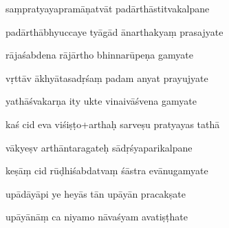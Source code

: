 \documentclass[article,12pt,a4paper]{memoir}%
\newcounter{parCount}
\begin{document}
	  
	  \pstart {} saṃpratyayapramāṇatvāt padārthāstitvakalpane 
	{}
	\pend%
      

	  
	  \pstart \leavevmode%
	padārthābhyuccaye tyāgād ānarthakyaṃ prasajyate 
	{}
	\pend%
      

	  
	  \pstart {} rājaśabdena rājārtho bhinnarūpeṇa gamyate 
	{}
	\pend%
      

	  
	  \pstart \leavevmode%
	vṛttāv ākhyātasadṛśaṃ padam anyat prayujyate 
	{}
	\pend%
      

	  
	  \pstart {} yathāśvakarṇa ity ukte vinaivāśvena gamyate 
	{}
	\pend%
      

	  
	  \pstart \leavevmode%
	kaś cid eva viśiṣṭo+arthaḥ sarveṣu pratyayas tathā 
	{}
	\pend%
      

	  
	  \pstart {} vākyeṣv arthāntaragateḥ sādṛśyaparikalpane 
	{}
	\pend%
      

	  
	  \pstart \leavevmode%
	keṣāṃ cid rūḍhiśabdatvaṃ śāstra evānugamyate 
	{}
	\pend%
      

	  
	  \pstart {} upādāyāpi ye heyās tān upāyān pracakṣate 
	{}
	\pend%
      

	  
	  \pstart \leavevmode%
	upāyānāṃ ca niyamo nāvaśyam avatiṣṭhate 
	{}
	\pend%
      
\end{document}
